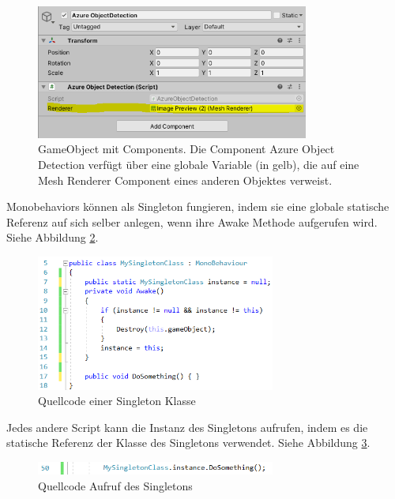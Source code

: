 \begin{figure}[H]
	\centering
	\includegraphics[width=0.8\textwidth]{images/img_globalVars.png}
	\caption[]{GameObject mit Components. Die Component Azure Object Detection verfügt über eine globale Variable (in gelb), die auf eine Mesh Renderer Component eines anderen Objektes verweist.}
	\label{img:gloabvars}
\end{figure}

Monobehaviors können als Singleton fungieren, indem sie eine globale statische Referenz auf sich selber anlegen, wenn ihre Awake Methode aufgerufen wird. Siehe Abbildung \ref{code:singleton}. %

\begin{figure}[H]
	\centering
	\includegraphics[width=0.7\textwidth]{images/code_singleton.png}
	\caption[]{Quellcode einer Singleton Klasse}
	\label{code:singleton}
\end{figure}

Jedes andere Script kann die Instanz des Singletons aufrufen, indem es die statische Referenz der Klasse des Singletons verwendet. Siehe Abbildung \ref{code:singleton2}.

\begin{figure}[H]
	\centering
	\includegraphics[width=0.7\textwidth]{images/code_singleton2.png}
	\caption[]{Quellcode Aufruf des Singletons}
	\label{code:singleton2}
\end{figure}


